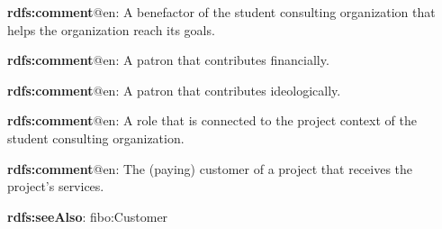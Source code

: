 \documentclass[a4paper, DIV=13, BCOR=0cm]{scrbook}
\begin{document}
\begin{mdframed}[style=onto-2, frametitle={Patron}]
	{%
		\begin{compactitem}
			\item \textbf{rdfs:comment}@en: A benefactor of the student consulting organization that helps the organization reach its goals.
		\end{compactitem}
	} %
\end{mdframed}

\begin{mdframed}[style=onto-3, frametitle={Financial Patron}]
	{%
		\begin{compactitem}
			\item \textbf{rdfs:comment}@en: A patron that contributes financially.
		\end{compactitem}
	} %
\end{mdframed}

\begin{mdframed}[style=onto-3, frametitle={Ideological Patron}]
	{%
		\begin{compactitem}
			\item \textbf{rdfs:comment}@en: A patron that contributes ideologically.
		\end{compactitem}
	} %
\end{mdframed}

\begin{mdframed}[style=onto-2, frametitle={Project Role}]
	{%
		\begin{compactitem}
			\item \textbf{rdfs:comment}@en: A role that is connected to the project context of the student consulting organization.
		\end{compactitem}
	} %
\end{mdframed}

\begin{mdframed}[style=onto-3, frametitle={Project Customer}]
	{%
		\begin{compactitem}
			\item \textbf{rdfs:comment}@en: The (paying) customer of a project that receives the project's services.
			\item \textbf{rdfs:seeAlso}: fibo:Customer
		\end{compactitem}
	} %
\end{mdframed}
\end{document}
